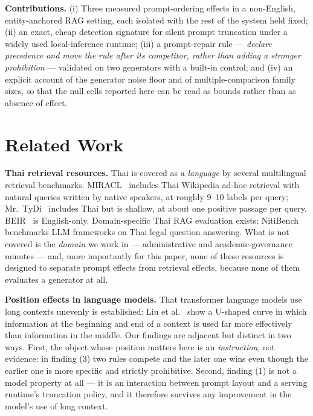 \documentclass[conference]{IEEEtran}
\begin{document}
\textbf{Contributions.} (i) Three measured prompt-ordering effects in a
non-English, entity-anchored RAG setting, each isolated with the rest of the
system held fixed; (ii) an exact, cheap detection signature for silent prompt
truncation under a widely used local-inference runtime; (iii) a prompt-repair
rule --- \emph{declare precedence and move the rule after its competitor, rather
than adding a stronger prohibition} --- validated on two generators with a
built-in control; and (iv) an explicit account of the generator noise floor and
of multiple-comparison family sizes, so that the null cells reported here can be
read as bounds rather than as absence of effect.

\section{Related Work}

\textbf{Thai retrieval resources.} Thai is covered as a \emph{language} by
several multilingual retrieval benchmarks. MIRACL~\cite{zhang2023miracl}
includes Thai Wikipedia ad-hoc retrieval with natural queries written by native
speakers, at roughly 9--10 labels per query; Mr.~TyDi~\cite{zhang2021mrtydi}
includes Thai but is shallow, at about one positive passage per query.
BEIR~\cite{thakur2021beir} is English-only. Domain-specific Thai RAG evaluation
exists: NitiBench~\cite{nitibench2025} benchmarks LLM frameworks on Thai legal
question answering. What is not covered is the \emph{domain} we work in ---
administrative and academic-governance minutes --- and, more importantly for this
paper, none of these resources is designed to separate prompt effects from
retrieval effects, because none of them evaluates a generator at all.

\textbf{Position effects in language models.} That transformer language models
use long contexts unevenly is established: Liu et al.~\cite{liu2024lost} show a
U-shaped curve in which information at the beginning and end of a context is used
far more effectively than information in the middle. Our findings are adjacent
but distinct in two ways. First, the object whose position matters here is an
\emph{instruction}, not evidence: in finding (3) two rules compete and the later
one wins even though the earlier one is more specific and strictly prohibitive.
Second, finding (1) is not a model property at all --- it is an interaction
between prompt layout and a serving runtime's truncation policy, and it therefore
survives any improvement in the model's use of long context.
\end{document}
